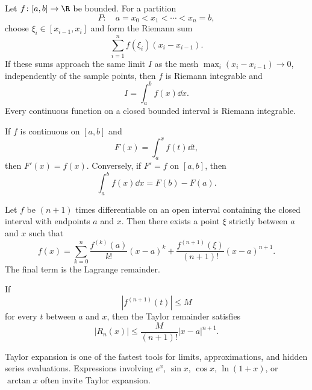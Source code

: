     \begin{definition}
        Let $f\colon [a,b]\to\R$ be bounded. For a partition
        \[
            P:\quad a=x_0<x_1<\cdots<x_n=b,
        \]
        choose $\xi_i\in[x_{i-1},x_i]$ and form the Riemann sum
        \[
            \sum_{i=1}^{n}f(\xi_i)(x_i-x_{i-1}).
        \]
        If these sums approach the same limit $I$ as the mesh
        $\max_i(x_i-x_{i-1})\to0$, independently of the sample points, then
        $f$ is Riemann integrable and
        \[
            I=\int_a^b f(x)\dd x.
        \]
        Every continuous function on a closed bounded interval is Riemann
        integrable.
    \end{definition}

    \begin{theorem}
        If $f$ is continuous on $[a,b]$ and
        \[
            F(x)=\int_a^x f(t)\dd t,
        \]
        then $F'(x)=f(x)$. Conversely, if $F'=f$ on $[a,b]$, then
        \[
            \int_a^b f(x)\dd x=F(b)-F(a).
        \]
    \end{theorem}

    \begin{theorem}
        Let $f$ be $(n+1)$ times differentiable on an open interval containing
        the closed interval with endpoints $a$ and $x$. Then there exists a
        point $\xi$ strictly between $a$ and $x$ such that
        \[
            f(x)
            =
            \sum_{k=0}^{n}\frac{f^{(k)}(a)}{k!}(x-a)^k
            +
            \frac{f^{(n+1)}(\xi)}{(n+1)!}(x-a)^{n+1}.
        \]
        The final term is the Lagrange remainder.
    \end{theorem}

    \begin{corollary}
        If
        \[
            |f^{(n+1)}(t)|\leq M
        \]
        for every $t$ between $a$ and $x$, then the Taylor remainder satisfies
        \[
            |R_n(x)|
            \leq
            \frac{M}{(n+1)!}|x-a|^{n+1}.
        \]
    \end{corollary}

    \begin{strategy}
        Taylor expansion is one of the fastest tools for limits, approximations,
        and hidden series evaluations. Expressions involving $e^x$, $\sin x$,
        $\cos x$, $\ln(1+x)$, or $\arctan x$ often invite Taylor expansion.
    \end{strategy}

